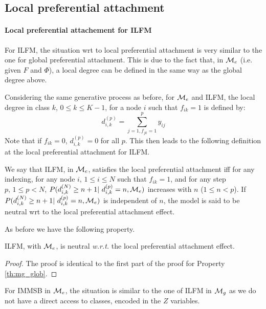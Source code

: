 \subsection{Local preferential attachment}
\label{sec:local_me}

\paragraph{Local preferential attachement for ILFM}

For ILFM, the situation wrt to local preferential attachment is very similar to the one for global preferential attachment. This is due to the fact that, in $\mathcal{M}_e$ (i.e. given $F$ and $\Phi$), a local degree can be defined in the same way as the global degree above.

Considering the same generative process as before, for $\mathcal{M}_e$ and ILFM, the local degree in class $k$, $0\leq k\leq K-1$, for a node $i$ such that $f_{ik}=1$ is defined by:
%
\begin{equation*}
d_{i,k}^{(p)} = \sum_{j=1, f_{jk}=1}^p y_{ij}
\end{equation*}
%
Note that if $f_{ik}=0$, $d_{i,k}^{(p)} = 0$ for all $p$. This then leads to the following definition at the local preferential attachment for ILFM.
%
\begin{definition}
We say that ILFM, in $\mathcal{M}_e$, satisfies the local preferential attachment iff for any indexing, for any node $i, \, 1\leq i \leq N$ such that $f_{ik}=1$, and for any step $p, \, 1\leq p < N$, $P(d_{i,k}^{(N)} \geq n+1 | d_{i,k}^{(p)}=n,\M_e)$ increases with $n$ ($1\leq n < p$). If $P(d_{i,k}^{(N)} \geq n+1 | d_{i,k}^{(p)}=n,\M_e)$ is independent of $n$, the model is said to be neutral wrt to the local preferential attachment effect.
\end{definition}
%
As before we have the following property.
%
\begin{proposition}
ILFM, with $\mathcal{M}_e$, is neutral \textit{w.r.t.} the local preferential attachment effect.
\end{proposition}

\begin{proof}
The proof is identical to the first part of the proof for Property \ref{th:mg_glob}.
\end{proof}

For IMMSB in $\mathcal{M}_e$, the situation is similar to the one of ILFM in $\mathcal{M}_g$ as we do not have a direct access to classes, encoded in the $Z$ variables.

